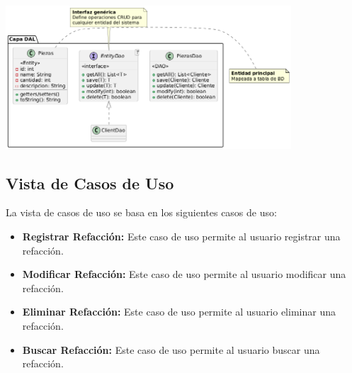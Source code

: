 \begin{itemize}
\begin{center}
        \includegraphics[width=0.8\textwidth]{imag/ImagenDiagramaUmlCapaAccesoDatos.png}
        \newline
    \end{center}
\end{itemize}

\subsection*{Vista de Casos de Uso}

    La vista de casos de uso se basa en los siguientes casos de uso:
    \begin{itemize}
        \item \textbf{Registrar Refacción:} Este caso de uso permite al usuario registrar una refacción.
        \item \textbf{Modificar Refacción:} Este caso de uso permite al usuario modificar una refacción.
        \item \textbf{Eliminar Refacción:} Este caso de uso permite al usuario eliminar una refacción.
        \item \textbf{Buscar Refacción:} Este caso de uso permite al usuario buscar una refacción.
    \end{itemize}

